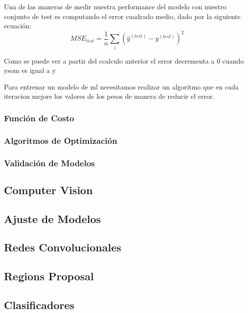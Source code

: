 Una de las maneras de medir nuestra performance del modelo con nuestro conjunto de test es computando el error cuadrado medio, dado por la siguiente ecuación:
\begin{equation}
MSE_{test} = \frac{1}{n}\sum_{i}(\hat{y}^(test)- y^(test))^2
\end{equation}

Como se puede ver a partir del ccalculo anterior el error decrementa a 0 cuando ysom es igual a y


Para entrenar un modelo de \ac{ml} necesitamos realizar un algoritmo que en cada iteracion mejore los valores de los pesos de manera de reducir el error.






\subsubsection{Función de Costo}

\subsubsection{Algoritmos de Optimización} 

\subsubsection{Validación de Modelos}


\subsection{Computer Vision}

\subsection{Ajuste de Modelos}

\subsection{Redes Convolucionales}

\subsection{Regions Proposal}

\subsection{Clasificadores}







